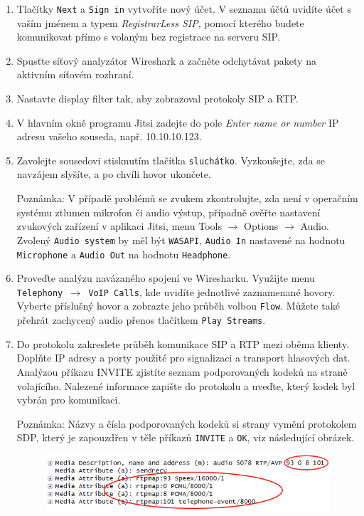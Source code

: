 \documentclass[a4paper,11pt]{article}
\begin{document}
\begin{enumerate}
    \item Tlačítky {\tt Next} a {\tt Sign in} vytvoříte nový účet. V seznamu účtů  uvidíte účet s vaším jménem a typem {\it RegistrarLess SIP}, pomocí kterého budete komunikovat přímo s volaným bez registrace na serveru SIP.
    \item Spusťte síťový analyzátor Wireshark a začněte odchytávat pakety na aktivním síťovém rozhraní.
    \item Nastavte display filter tak, aby zobrazoval protokoly SIP a RTP.
    \item V hlavním okně programu Jitsi zadejte do pole {\it Enter name or number} IP adresu vašeho souseda, např. 10.10.10.123.
    \item Zavolejte sousedovi stisknutím tlačítka {\tt sluchátko}. Vyzkoušejte, zda se navzájem slyšíte, a po chvíli hovor ukončete.
      
     {\small Poznámka: V případě problémů se zvukem zkontrolujte, zda není v operačním systému ztlumen mikrofon či audio výstup, případně ověřte nastavení zvukových zařízení v aplikaci Jitsi, menu Tools $\rightarrow$ Options $\rightarrow$ Audio. Zvolený {\tt Audio system} by měl být {\tt WASAPI}, {\tt Audio In} nastavené na hodnotu {\tt Microphone} a {\tt Audio Out} na hodnotu {\tt Headphone}.}
 
   \item Proveďte analýzu navázaného spojení ve Wiresharku. Využijte menu {\tt Telephony $\rightarrow$ VoIP Calls}, kde uvidíte jednotlivé zaznamenané hovory. Vyberte příslušný hovor a zobrazte jeho průběh volbou {\tt Flow}.  Můžete také přehrát zachycený audio přenos tlačítkem {\tt Play Streams}.
     
    \item Do protokolu zakreslete průběh komunikace SIP a RTP mezi oběma klienty. Doplňte IP adresy a porty použité pro signalizaci a transport hlasových dat. Analýzou příkazu INVITE zjistíte seznam podporovaných kodeků na straně volajícího. Nalezené informace zapište do protokolu a uveďte, který kodek byl vybrán pro komunikaci. 

      {\small
      Poznámka: Názvy a čísla podporovaných kodeků si strany vymění protokolem SDP, který je zapouzdřen v těle příkazů {\tt INVITE} a {\tt OK}, viz následující obrázek.
\begin{figure}[h!]
  \centering
  \includegraphics[scale=0.65]{img/3a.png}
\end{figure}

}
\end{enumerate}
\end{document}
